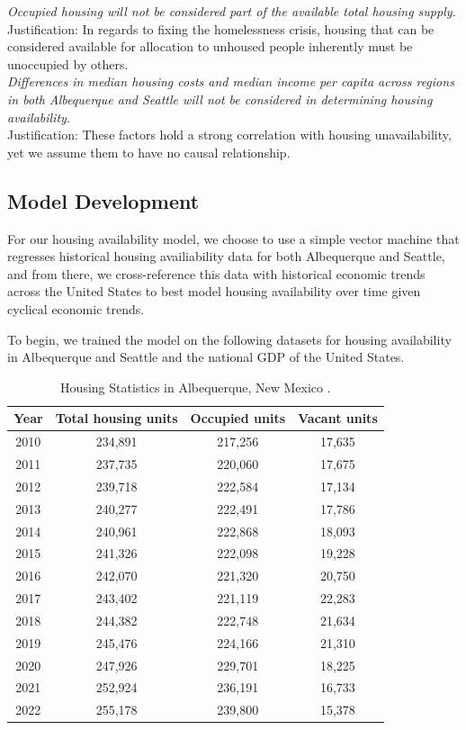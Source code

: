 \documentclass[12pt]{article}
\begin{document}
\noindent
\textit{Occupied housing will not be considered part of the available total housing supply.} \\

\noindent
Justification: In regards to fixing the homelessness crisis, housing that can be considered available for allocation to
unhoused people inherently must be unoccupied by others. \\

\noindent
\textit{Differences in median housing costs and median income per capita across regions in both Albequerque and Seattle
will not be considered in determining housing availability.} \\

\noindent
Justification: These factors hold a strong correlation with housing unavailability, yet we assume them to have no
causal relationship. \\

\subsection{Model Development}
For our housing availability model, we choose to use a simple vector machine that regresses historical housing availiability
data for both Albequerque and Seattle, and from there, we cross-reference this data with historical economic trends
across the United States to best model housing availability over time given cyclical economic trends.

\noindent
To begin, we trained the model on the following datasets for housing availability in Albequerque and Seattle and the
national GDP of the United States.

\begin{table}[H]
  \centering
  \begin{tabular}{|c c c c|} 
    \hline 
    Year & Total housing units & Occupied units & Vacant units \\ [0.5ex]
    \hline
    2010  &  234,891 & 217,256 & 17,635 \\
    2011  &  237,735 & 220,060 & 17,675 \\
    2012  &  239,718 & 222,584 & 17,134 \\
    2013  &  240,277 & 222,491 & 17,786 \\
    2014  &  240,961 & 222,868 & 18,093 \\
    2015  &  241,326 & 222,098 & 19,228 \\
    2016  &  242,070 & 221,320 & 20,750 \\
    2017  &  243,402 & 221,119 & 22,283 \\
    2018  &  244,382 & 222,748 & 21,634 \\
    2019  &  245,476 & 224,166 & 21,310 \\
    2020  &  247,926 & 229,701 & 18,225 \\
    2021  &  252,924 & 236,191 & 16,733 \\
    2022  &  255,178 & 239,800 & 15,378 \\ [1ex] 
    \hline
  \end{tabular}
  \caption{Housing Statistics in Albequerque, New Mexico \cite{Census2010ACSDP1Y2010.DP04}.}
\end{table}
\end{document}
